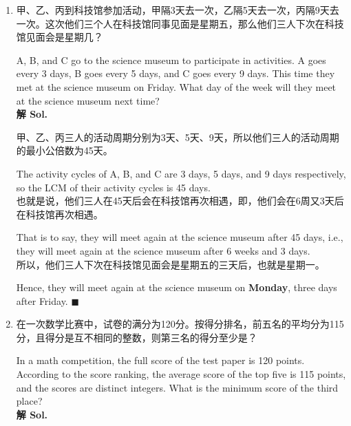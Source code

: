 \documentclass{ctexart}
\begin{document}
\begin{enumerate}
\begin{multicols}{2}
              所以，乙环行一周需26分钟。

              Therefore, B takes 26 minutes per lap. \hfill $\blacksquare$
          \end{multicols}

    \item 甲、乙、丙到科技馆参加活动，甲隔3天去一次，乙隔5天去一次，丙隔9天去一次。这次他们三个人在科技馆同事见面是星期五，那么他们三人下次在科技馆见面会是星期几？

          A, B, and C go to the science museum to participate in activities. A goes every
          3 days, B goes every 5 days, and C goes every 9 days. This time they met at the
          science museum on Friday. What day of the week will they meet at the science
          museum next time? \\

          \textbf{解 Sol.}

          甲、乙、丙三人的活动周期分别为3天、5天、9天，所以他们三人的活动周期的最小公倍数为45天。

          The activity cycles of A, B, and C are 3 days, 5 days, and 9 days respectively,
          so the LCM of their activity cycles is 45 days.\\

          也就是说，他们三人在45天后会在科技馆再次相遇，即，他们会在6周又3天后在科技馆再次相遇。

          That is to say, they will meet again at the science museum after 45 days, i.e.,
          they will meet again at the science museum after 6 weeks and 3 days.\\

          所以，他们三人下次在科技馆见面会是星期五的三天后，也就是星期一。

          Hence, they will meet again at the science museum on \textbf{Monday}, three
          days after Friday. \hfill $\blacksquare$

    \item 在一次数学比赛中，试卷的满分为120分。按得分排名，前五名的平均分为115分，且得分是互不相同的整数，则第三名的得分至少是？

          In a math competition, the full score of the test paper is 120 points.
          According to the score ranking, the average score of the top five is 115
          points, and the scores are distinct integers. What is the minimum score of the
          third place?\\

          \textbf{解 Sol.}


\end{enumerate}
\end{document}

